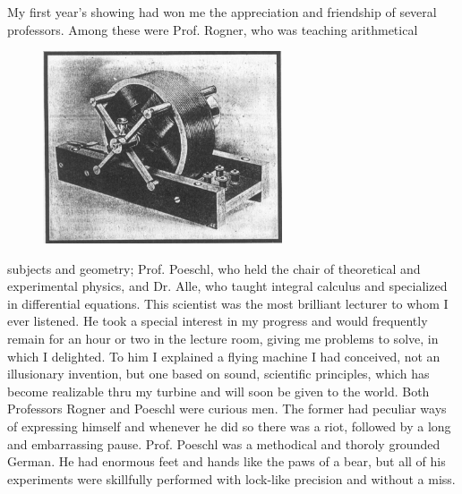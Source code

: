 \documentclass[a4paper,12pt,english,twoside,openright]{memoir}
\begin{document}
My first year's showing had won me the appreciation and friendship of several professors. Among these were Prof. Rogner, who was teaching arithmetical 
\begin{figure}
	\vspace{-20pt}
	\begin{center}
		\includegraphics[width=0.63\textwidth]{IndMotor.png}
	\end{center}
	\vspace{-20pt}
\end{figure}
subjects and geometry;  Prof.  
Poeschl, who held the chair of theoretical and experimental physics, and Dr. Alle, who taught 
integral calculus and specialized in differential equations.  This scientist was the most brilliant 
lecturer to whom I ever listened.  He took a special interest in my progress and would frequently 
remain for an hour or two in the lecture room, giving me problems to solve, in which I delighted.  
To him I explained a flying machine I had conceived, not an illusionary invention, but one based 
on sound, scientific principles, which has become realizable thru my turbine and will soon be 
given to the world.  Both Professors Rogner and Poeschl were curious men.  The former had 
peculiar ways of expressing himself and whenever he did so there was a riot, followed by a long 
and embarrassing pause.  Prof. Poeschl was a methodical and thoroly grounded German.  He 
had enormous feet and hands like the paws of a bear, but all of his experiments were skillfully 
performed with lock-like precision and without a miss.  
\end{document}

